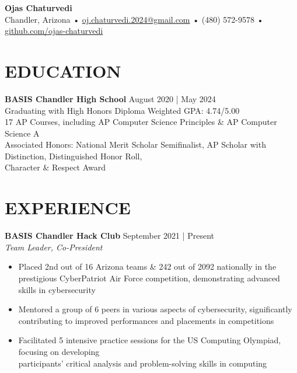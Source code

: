 \documentclass[a4paper,10pt]{extarticle}
\begin{document}

\pagestyle{empty}
\fancyhf{}
\renewcommand{\headrulewidth}{0pt} %
\renewcommand{\footrulewidth}{0pt} %
\thispagestyle{fancy} %

\begin{center}
\textbf{\Large Ojas Chaturvedi}\\[2pt] %
Chandler, Arizona • \href{mailto:oj.chaturvedi.2024@gmail.com}{oj.chaturvedi.2024@gmail.com} • (480) 572-9578 • \href{https://www.github.com/ojas-chaturvedi}{\underline{github.com/ojas-chaturvedi}} %
\end{center}

\section*{EDUCATION}
\noindent
\textbf{BASIS Chandler High School} \hfill August 2020 | May 2024 \\
Graduating with High Honors Diploma \hfill Weighted GPA\@: 4.74/5.00 \\
17 AP Courses, including AP Computer Science Principles \& AP Computer Science A \\
Associated Honors: National Merit Scholar Semifinalist, AP Scholar with Distinction, Distinguished Honor Roll, \\
Character \& Respect Award

\section*{EXPERIENCE}
\noindent
\textbf{BASIS Chandler Hack Club} \hfill September 2021 | Present \\
\textit{Team Leader, Co-President}
\begin{itemize}
    \item Placed 2nd out of 16 Arizona teams \& 242 out of 2092 nationally in the prestigious CyberPatriot Air Force competition, demonstrating advanced skills in cybersecurity
    \item Mentored a group of 6 peers in various aspects of cybersecurity, significantly contributing to improved performances and placements in competitions
    \item Facilitated 5 intensive practice sessions for the US Computing Olympiad, focusing on developing \\ participants' critical analysis and problem-solving skills in computing
\end{itemize}
\end{document}
